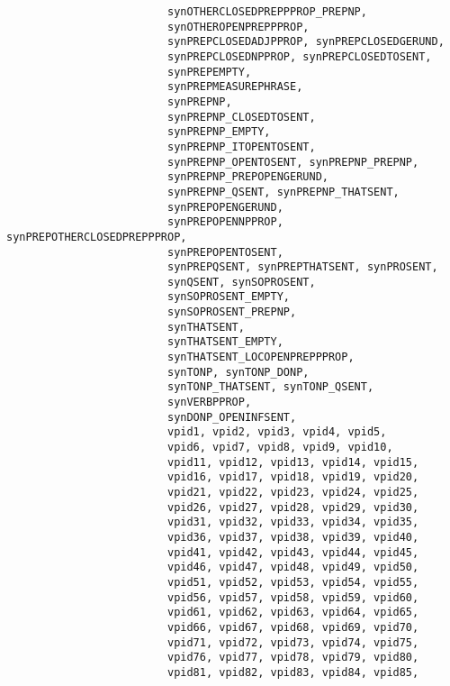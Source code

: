 \begin{verbatim}
                         synOTHERCLOSEDPREPPPROP_PREPNP, 
                         synOTHEROPENPREPPPROP,
                         synPREPCLOSEDADJPPROP, synPREPCLOSEDGERUND, 
                         synPREPCLOSEDNPPROP, synPREPCLOSEDTOSENT, 
                         synPREPEMPTY,                   
                         synPREPMEASUREPHRASE,           
                         synPREPNP, 
                         synPREPNP_CLOSEDTOSENT,         
                         synPREPNP_EMPTY,                
                         synPREPNP_ITOPENTOSENT,         
                         synPREPNP_OPENTOSENT, synPREPNP_PREPNP, 
                         synPREPNP_PREPOPENGERUND,       
                         synPREPNP_QSENT, synPREPNP_THATSENT, 
                         synPREPOPENGERUND,              
                         synPREPOPENNPPROP, synPREPOTHERCLOSEDPREPPPROP,
                         synPREPOPENTOSENT,              
                         synPREPQSENT, synPREPTHATSENT, synPROSENT, 
                         synQSENT, synSOPROSENT, 
                         synSOPROSENT_EMPTY,             
                         synSOPROSENT_PREPNP,            
                         synTHATSENT, 
                         synTHATSENT_EMPTY,              
                         synTHATSENT_LOCOPENPREPPPROP,   
                         synTONP, synTONP_DONP,          
                         synTONP_THATSENT, synTONP_QSENT,
                         synVERBPPROP,                   
                         synDONP_OPENINFSENT,
                         vpid1, vpid2, vpid3, vpid4, vpid5,
                         vpid6, vpid7, vpid8, vpid9, vpid10,
                         vpid11, vpid12, vpid13, vpid14, vpid15,
                         vpid16, vpid17, vpid18, vpid19, vpid20,
                         vpid21, vpid22, vpid23, vpid24, vpid25,
                         vpid26, vpid27, vpid28, vpid29, vpid30,
                         vpid31, vpid32, vpid33, vpid34, vpid35,
                         vpid36, vpid37, vpid38, vpid39, vpid40,
                         vpid41, vpid42, vpid43, vpid44, vpid45,
                         vpid46, vpid47, vpid48, vpid49, vpid50,
                         vpid51, vpid52, vpid53, vpid54, vpid55,
                         vpid56, vpid57, vpid58, vpid59, vpid60,
                         vpid61, vpid62, vpid63, vpid64, vpid65,
                         vpid66, vpid67, vpid68, vpid69, vpid70,
                         vpid71, vpid72, vpid73, vpid74, vpid75,
                         vpid76, vpid77, vpid78, vpid79, vpid80,
                         vpid81, vpid82, vpid83, vpid84, vpid85,

\end{verbatim}
